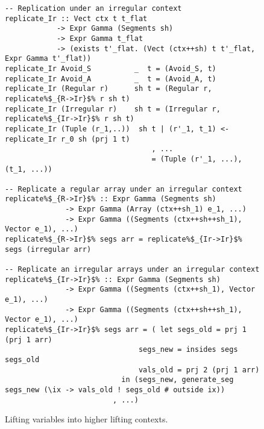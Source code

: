 \begin{figure}
\begin{lstlisting}[style=ndp]
-- Replication under an irregular context
replicate_Ir :: Vect ctx t t_flat
            -> Expr Gamma (Segments sh)
            -> Expr Gamma t_flat
            -> (exists t'_flat. (Vect (ctx++sh) t t'_flat, Expr Gamma t'_flat))
replicate_Ir Avoid_S          _  t = (Avoid_S, t)
replicate_Ir Avoid_A          _  t = (Avoid_A, t)
replicate_Ir (Regular r)      sh t = (Regular r, replicate%$_{R->Ir}$% r sh t)
replicate_Ir (Irregular r)    sh t = (Irregular r, replicate%$_{Ir->Ir}$% r sh t)
replicate_Ir (Tuple (r_1,..))  sh t | (r'_1, t_1) <- replicate_Ir r_0 sh (prj 1 t)
                                  , ...
                                  = (Tuple (r'_1, ...), (t_1, ...))

-- Replicate a regular array under an irregular context
replicate%$_{R->Ir}$% :: Expr Gamma (Segments sh)
              -> Expr Gamma (Array (ctx++sh_1) e_1, ...)
              -> Expr Gamma ((Segments (ctx++sh++sh_1), Vector e_1), ...)
replicate%$_{R->Ir}$% segs arr = replicate%$_{Ir->Ir}$% segs (irregular arr)

-- Replicate an irregular arrays under an irregular context
replicate%$_{Ir->Ir}$% :: Expr Gamma (Segments sh)
              -> Expr Gamma ((Segments (ctx++sh_1), Vector e_1), ...)
              -> Expr Gamma ((Segments (ctx++sh++sh_1), Vector e_1), ...)
replicate%$_{Ir->Ir}$% segs arr = ( let segs_old = prj 1 (prj 1 arr)
                               segs_new = insides segs segs_old
                               vals_old = prj 2 (prj 1 arr)
                           in (segs_new, generate_seg segs_new (\ix -> vals_old ! segs_old # outside ix))
                         , ...)
\end{lstlisting}
\caption{Lifting variables into higher lifting contexts.}
\label{fig:lst-variables}
\end{figure}

